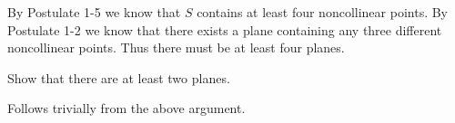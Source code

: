 \begin{solution}
  By Postulate 1-5 we know that $S$ contains at least four noncollinear points.
  By Postulate 1-2 we know that there exists a plane containing any three different noncollinear points.
  Thus there must be at least four planes.
\end{solution}

\begin{problem}
  Show that there are at least two planes.
\end{problem}

\begin{problem}
  Follows trivially from the above argument.
\end{problem}
